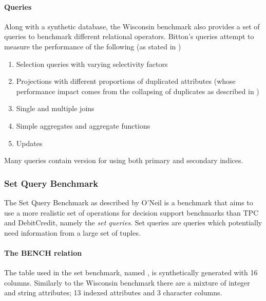 \paragraph{Queries} Along with a synthetic database, the Wisconsin benchmark
also provides a set of queries to benchmark different relational operators.
Bitton's queries attempt to measure the performance of the following (as stated
in \cite{Wisconsin})
\begin{enumerate}
    \item Selection queries with varying selectivity factors
    \item Projections with different proportions of duplicated attributes (whose
        performance impact comes from the collapsing of duplicates as described
        in )
    \item Single and multiple joins
    \item Simple aggregates and aggregate functions
    \item Updates
\end{enumerate}
Many queries contain version for using both primary and secondary indices.

\subsubsection{Set Query Benchmark}
The Set Query Benchmark as described by O'Neil \cite{SetQueryBenchmark} is a
benchmark that aims to use a more realistic set of operations for decision
support benchmarks than TPC and DebitCredit, namely the \emph{set queries}. Set queries
are queries which potentially need information from a large set of tuples.

\paragraph{The BENCH relation} The table used in the set benchmark, named
, is synthetically generated with 16 columns. Similarly to the
Wisconsin benchmark there are a mixture of integer and string attributes; 13
indexed attributes and 3 character columns.
